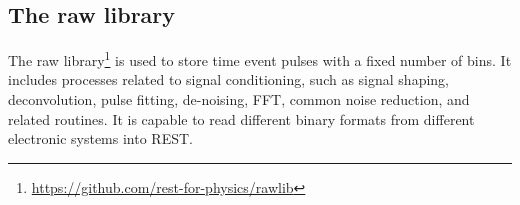 \begin{figure}[hb!]
  \centering
	\caption{}\label{fig:readouts}
\end{figure}

\subsection{The raw library}

The raw library\footnote{\url{https://github.com/rest-for-physics/rawlib}} is used to store time event pulses with a fixed number of bins. It includes processes related to signal conditioning, such as signal shaping, deconvolution, pulse fitting, de-noising, FFT, common noise reduction, and related routines. It is capable to read different binary formats from different electronic systems into REST.

